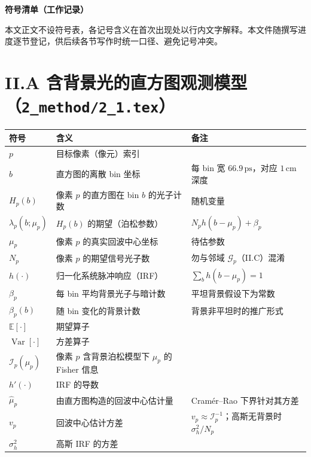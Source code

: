 \documentclass[11pt]{ctexart}
\newcommand{\E}{\mathbb{E}}
\newcommand{\Var}{\operatorname{Var}}
\begin{document}
\begin{center}
  {\LARGE\bfseries 符号清单（工作记录）}
\end{center}
\vspace{0.5em}

本文正文不设符号表，各记号含义在首次出现处以行内文字解释。本文件随撰写进度逐节登记，供后续各节写作时统一口径、避免记号冲突。

\section*{II.A 含背景光的直方图观测模型（\texttt{2\_method/2\_1.tex}）}

\begin{center}
\begin{tabular}{@{}llp{}@{}}
\toprule
符号 & 含义 & 备注 \\
\midrule
$p$ & 目标像素（像元）索引 & \\
$b$ & 直方图的离散 bin 坐标 & 每 bin 宽 $66.9\,\mathrm{ps}$，对应 $1\,\mathrm{cm}$ 深度 \\
$H_p(b)$ & 像素 $p$ 的直方图在 bin $b$ 的光子计数 & 随机变量 \\
$\lambda_p(b;\mu_p)$ & $H_p(b)$ 的期望（泊松参数） & $N_p h(b-\mu_p)+\beta_p$ \\
$\mu_p$ & 像素 $p$ 的真实回波中心坐标 & 待估参数 \\
$N_p$ & 像素 $p$ 的期望信号光子数 & 勿与邻域 $\mathcal{G}_p$（II.C）混淆 \\
$h(\cdot)$ & 归一化系统脉冲响应（IRF） & $\sum_b h(b-\mu_p)=1$ \\
$\beta_p$ & 每 bin 平均背景光子与暗计数 & 平坦背景假设下为常数 \\
$\beta_p(b)$ & 随 bin 变化的背景计数 & 背景非平坦时的推广形式 \\
$\E[\cdot]$ & 期望算子 & \\
$\Var[\cdot]$ & 方差算子 & \\
$\mathcal I_p(\mu_p)$ & 像素 $p$ 含背景泊松模型下 $\mu_p$ 的 Fisher 信息 & \\
$h'(\cdot)$ & IRF 的导数 & \\
$\hat\mu_p$ & 由直方图构造的回波中心估计量 & Cram\'er--Rao 下界针对其方差 \\
$v_p$ & 回波中心估计方差 & $v_p\approx\mathcal I_p^{-1}$；高斯无背景时 $\sigma_h^2/N_p$ \\
$\sigma_h^2$ & 高斯 IRF 的方差 & \\
\bottomrule
\end{tabular}
\end{center}
\end{document}
